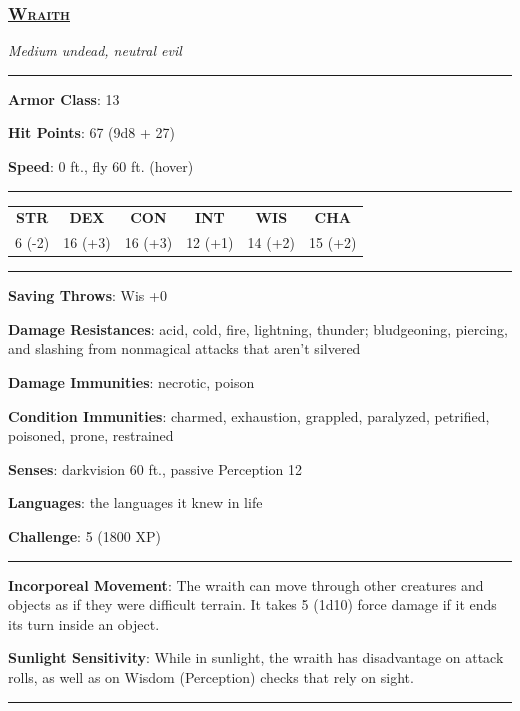 \subsubsection*{\underline{\textsc{\Large Wraith}}}
\noindent\emph{Medium undead, neutral evil}

\noindent\rule{0.5\textwidth}{0.5pt}

\noindent\textbf{Armor Class}: 13

\noindent\textbf{Hit Points}: 67 (9d8 + 27)

\noindent\textbf{Speed}: 0 ft., fly 60 ft. (hover)

\noindent\rule{0.5\textwidth}{0.5pt}
\begin{table}[H]
	\begin{tabular}{cccccc}
		\textbf{STR} & \textbf{DEX} & \textbf{CON} & \textbf{INT} & \textbf{WIS} & \textbf{CHA} \\
		6 (-2) & 16 (+3) & 16 (+3) & 12 (+1) & 14 (+2) & 15 (+2) \\
	\end{tabular}
\end{table}
\noindent\rule{0.5\textwidth}{0.5pt}

\noindent\textbf{Saving Throws}: Wis +0

\noindent\textbf{Damage Resistances}:  acid, cold, fire, lightning, thunder; bludgeoning, piercing, and slashing from nonmagical attacks that aren't silvered

\noindent\textbf{Damage Immunities}: necrotic, poison

\noindent\textbf{Condition Immunities}: charmed, exhaustion, grappled, paralyzed, petrified, poisoned, prone, restrained

\noindent\textbf{Senses}: darkvision 60 ft., passive Perception 12

\noindent\textbf{Languages}: the languages it knew in life

\noindent\textbf{Challenge}: 5 (1800 XP)

\noindent\rule{0.5\textwidth}{0.5pt}

\noindent\textbf{Incorporeal Movement}: The wraith can move through other creatures and objects as if they were difficult terrain. It takes 5 (1d10) force damage if it ends its turn inside an object.

\noindent\textbf{Sunlight Sensitivity}: While in sunlight, the wraith has disadvantage on attack rolls, as well as on Wisdom (Perception) checks that rely on sight.

\noindent\rule{0.5\textwidth}{0.5pt}

